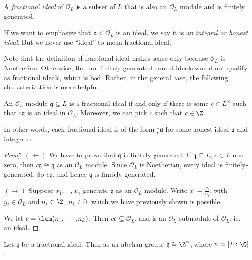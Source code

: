\documentclass[a4paper]{article}
\begin{document}
\begin{defi}
  A \emph{fractional ideal} of $\mathcal{O}_L$ is a subset of $L$ that is also an $\mathcal{O}_L$ module and is finitely generated.
\end{defi}

\begin{defi}
  If we want to emphasize that $\mathfrak{a} \lhd \mathcal{O}_L$ is an ideal, we say it is an \emph{integral or honest ideal}. But we never use ``ideal'' to mean fractional ideal.
\end{defi}

Note that the definition of fractional ideal makes sense only because $\mathcal{O}_L$ is Noetherian. Otherwise, the non-finitely-generated honest ideals would not qualify as fractional ideals, which is bad. Rather, in the general case, the following characterization is more helpful:

\begin{lemma}
  An $\mathcal{O}_L$ module $\mathfrak{q} \subseteq L$ is a fractional ideal if and only if there is some $c \in L^\times$ such that $c\mathfrak{q}$ is an ideal in $\mathcal{O}_L$. Moreover, we can pick $c$ such that $c \in \Z$.
\end{lemma}
In other words, each fractional ideal is of the form $\frac{1}{c} \mathfrak{a}$ for some honest ideal $\mathfrak{a}$ and integer $c$.
\begin{proof}
  $(\Leftarrow)$ We have to prove that $\mathfrak{q}$ is finitely generated. If $\mathfrak{q} \subseteq L$, $c \in L$ non-zero, then $c\mathfrak{q} \cong \mathfrak{q}$ as an $\mathcal{O}_L$ module. Since $\mathcal{O}_L$ is Noetherian, every ideal is finitely-generated. So $c\mathfrak{q}$, and hence $\mathfrak{q}$ is finitely generated.

  $(\Rightarrow)$ Suppose $x_1, \cdots, x_n$ generate $\mathfrak{q}$ as an $\mathcal{O}_L$-module. Write $x_i = \frac{y_i}{n_i}$, with $y_i \in \mathcal{O}_L$ and $n_i \in \Z$, $n_i \not= 0$, which we have previously shown is possible.

  We let $c = \lcm(n_1, \cdots, n_k)$. Then $c\mathfrak{q} \subseteq \mathcal{O}_L$, and is an $\mathcal{O}_L$-submodule of $\mathcal{O}_L$, ie. an ideal.
\end{proof}

\begin{cor}
  Let $\mathfrak{q}$ be a fractional ideal. Then as an abelian group, $\mathfrak{q} \cong \Z^n$, where $n = [L:\Q]$.
\end{cor}
\end{document}
